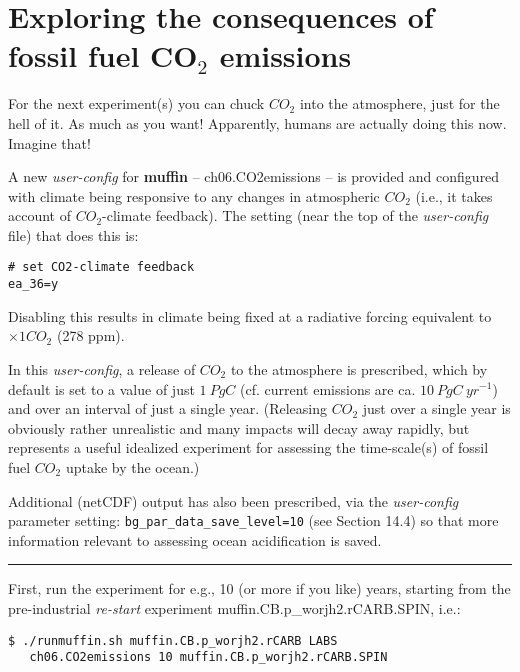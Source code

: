 \section{Exploring the consequences of fossil fuel CO$_{2}$ emissions}

For the next experiment(s) you can chuck \(CO_{2}\) into the atmosphere, just for the hell of it. As much as you want! Apparently, humans are actually doing this now. Imagine that!

\vspace{1mm}

A new \textit{user-config} for \textbf{muffin} -- \footnotesize\textsf{ch06.CO2emissions }\normalsize -- is provided and configured with climate being responsive to any changes in atmospheric \(CO_{2}\) (i.e., it takes account of \(CO_{2}\)-climate feedback). 
\vspace{1mm}
The setting (near the top of the \textit{user-config} file) that does this is:
\vspace{-2pt}\small\begin{verbatim}
# set CO2-climate feedback
ea_36=y
\end{verbatim}\normalsize\vspace{-2pt}
\noindent Disabling this results in climate being fixed at a radiative forcing equivalent to $\times 1 CO_{2}$ (278 ppm).

In this \textit{user-config}, a release of \(CO_{2}\) to the atmosphere is prescribed, which by default is set to a value of just \(1\:PgC\) (cf. current emissions are ca. \(10\:PgC\:yr^{-1}\)) and over an interval of just a single year. (Releasing \(CO_{2}\) just over a single year is obviously rather unrealistic and many impacts will decay away rapidly, but represents a useful idealized experiment for assessing the time-scale(s) of fossil fuel \(CO_{2}\) uptake by the ocean.)

\vspace{1mm}
Additional (netCDF) output has also been prescribed, via the \textit{user-config} parameter setting: \texttt{bg\_par\_data\_save\_level=10} (see Section 14.4) so that more information relevant to assessing ocean acidification is saved.

\vspace{1mm}
\noindent\rule{4cm}{0.1mm}
\vspace{2mm}

\noindent First, run the experiment for e.g., 10 (or more if you like) years, starting from the pre-industrial \textit{re-start} experiment \textsf{\footnotesize muffin.CB.p\_worjh2.rCARB.SPIN}, i.e.:
\begin{verbatim}
$ ./runmuffin.sh muffin.CB.p_worjh2.rCARB LABS
   ch06.CO2emissions 10 muffin.CB.p_worjh2.rCARB.SPIN
\end{verbatim}

